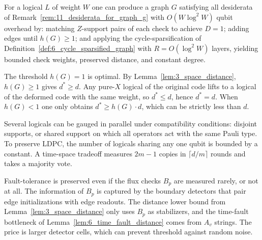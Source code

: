 \begin{remark}
\label{rem:12_worst_case_graph_construction}
\leanok
For a logical $L$ of weight $W$ one can produce a graph $G$ satisfying all desiderata of
Remark~\ref{rem:11_desiderata_for_graph_g} with $O(W \log^2 W)$ qubit overhead by:
matching $Z$-support pairs of each check to achieve $D = 1$; adding edges until $h(G) \ge 1$;
and applying the cycle-sparsification of Definition~\ref{def:6_cycle_sparsified_graph} with
$R = O(\log^2 W)$ layers, yielding bounded check weights, preserved distance, and constant degree.
\end{remark}

\begin{remark}
\label{rem:13_optimal_cheeger_constant}
\leanok
The threshold $h(G) = 1$ is optimal. By Lemma~\ref{lem:3_space_distance}, $h(G) \ge 1$ gives
$d^* \ge d$. Any pure-$X$ logical of the original code lifts to a logical of the deformed
code with the same weight, so $d^* \le d$, hence $d^* = d$. When $h(G) < 1$ one only obtains
$d^* \ge h(G) \cdot d$, which can be strictly less than $d$.
\end{remark}

\begin{remark}
\label{rem:14_parallel_gauging_measurement}
\leanok
Several logicals can be gauged in parallel under compatibility conditions: disjoint supports,
or shared support on which all operators act with the same Pauli type. To preserve LDPC, the
number of logicals sharing any one qubit is bounded by a constant. A time-space tradeoff
measures $2m-1$ copies in $\lceil d/m \rceil$ rounds and takes a majority vote.
\end{remark}

\begin{remark}
\label{rem:15_flux_check_measurement_frequency}
\leanok
Fault-tolerance is preserved even if the flux checks $B_p$ are measured rarely, or not at
all. The information of $B_p$ is captured by the boundary detectors that pair edge
initializations with edge readouts. The distance lower bound from
Lemma~\ref{lem:3_space_distance} only uses $B_p$ as stabilizers, and the time-fault
bottleneck of Lemma~\ref{lem:6_time_fault_distance} comes from $A_v$ strings. The price is
larger detector cells, which can prevent threshold against random noise.
\end{remark}

